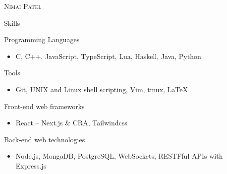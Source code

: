 \documentclass{article}
\newlength{\tabin}
\newlength{\secsep}
\newcommand{\lineunder}{\vspace*{-8pt} \\ \hspace*{-6pt} \hrulefill \\ \vspace*{-15pt}}
\newcommand{\name}[1]{\begin{center}\textsc{\Huge#1}\\\end{center}}
\newcommand{\contact}[1]{\begin{center}\color{contactgray}{\small#1}\end{center}}
\newenvironment{tabbedsection}[1]{
	\begin{list}{}{
		\setlength{\itemsep}{0pt}
		\setlength{\labelsep}{0pt}
		\setlength{\labelwidth}{0pt}
		\setlength{\leftmargin}{\tabin}
		\setlength{\rightmargin}{\tabin}
		\setlength{\listparindent}{0pt}
		\setlength{\parsep}{0pt}
		\setlength{\parskip}{0pt}
		\setlength{\partopsep}{0pt}
		\setlength{\topsep}{#1}
	}
	\item[]
}{\end{list}}
\newenvironment{resume_header}{\color{MyPurple}}{\vspace{0pt}}
\newenvironment{resume_section}[1]{
	\filbreak
	\vspace{2\secsep}
	\textsc{\large#1}
	\lineunder
	\begin{tabbedsection}{\secsep}
}{\end{tabbedsection}}
\newenvironment{resume_subsection}[2][]{
	\textbf{#2} \hfill {\footnotesize #1} \hspace{2em}
	\begin{tabbedsection}{0.5\secsep}
}{\end{tabbedsection}}
\newenvironment{subitems}{
	\renewcommand{\labelitemi}{-}
	\begin{itemize}
		\setlength{\labelsep}{1em}
}{\end{itemize}}
\begin{document}
\begin{resume_header}
\name{Nimai Patel}
	\contact{nimaipatel@tutanota.com}
\end{resume_header}

\begin{resume_section}{Skills}

	\begin{resume_subsection}{Programming Languages}
		\begin{subitems}
			\item C, C++, JavaScript, TypeScript, Lua, Haskell, Java, Python
		\end{subitems}
	\end{resume_subsection}

	\begin{resume_subsection}{Tools}
		\begin{subitems}
		\item Git, UNIX and Linux shell scripting, Vim, tmux, {\LaTeX}
		\end{subitems}
	\end{resume_subsection}

	\begin{resume_subsection}{Front-end web frameworks}
		\begin{subitems}
		\item React -- Next.js \& CRA, Tailwindcss
		\end{subitems}
	\end{resume_subsection}

	\begin{resume_subsection}{Back-end web technologies}
		\begin{subitems}
		\item Node.js, MongoDB, PostgreSQL, WebSockets, RESTFful APIs with Express.js
		\end{subitems}
	\end{resume_subsection}

\end{resume_section}
\end{document}

